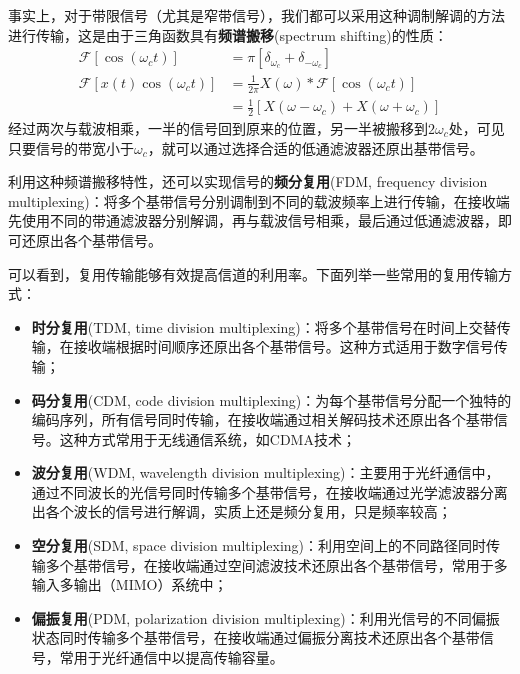 事实上，对于带限信号（尤其是窄带信号），我们都可以采用这种调制解调的方法进行传输，这是由于三角函数具有\textbf{频谱搬移}(spectrum shifting)的性质：\begin{align*}
    \mathcal{F} \left[\cos(\omega_c t)\right]&=\pi\left[\delta_{\omega_c}+\delta_{-\omega_c}\right]\\
    \mathcal{F}\left[x(t)\cos(\omega_c t)\right]&=\frac{1}{2\pi}X(\omega)*\mathcal{F}\left[\cos(\omega_c t)\right]\\
    &=\frac{1}{2}\left[X(\omega-\omega_c)+X(\omega+\omega_c)\right]
\end{align*}
经过两次与载波相乘，一半的信号回到原来的位置，另一半被搬移到$2\omega_c$处，可见只要信号的带宽小于$\omega_c$，就可以通过选择合适的低通滤波器还原出基带信号。

利用这种频谱搬移特性，还可以实现信号的\textbf{频分复用}(FDM, frequency division multiplexing)：将多个基带信号分别调制到不同的载波频率上进行传输，在接收端先使用不同的带通滤波器分别解调，再与载波信号相乘，最后通过低通滤波器，即可还原出各个基带信号。

可以看到，复用传输能够有效提高信道的利用率。下面列举一些常用的复用传输方式：\begin{itemize}
    \item \textbf{时分复用}(TDM, time division multiplexing)：将多个基带信号在时间上交替传输，在接收端根据时间顺序还原出各个基带信号。这种方式适用于数字信号传输；
    \item \textbf{码分复用}(CDM, code division multiplexing)：为每个基带信号分配一个独特的编码序列，所有信号同时传输，在接收端通过相关解码技术还原出各个基带信号。这种方式常用于无线通信系统，如CDMA技术；
    \item \textbf{波分复用}(WDM, wavelength division multiplexing)：主要用于光纤通信中，通过不同波长的光信号同时传输多个基带信号，在接收端通过光学滤波器分离出各个波长的信号进行解调，实质上还是频分复用，只是频率较高；
    \item \textbf{空分复用}(SDM, space division multiplexing)：利用空间上的不同路径同时传输多个基带信号，在接收端通过空间滤波技术还原出各个基带信号，常用于多输入多输出（MIMO）系统中；
    \item \textbf{偏振复用}(PDM, polarization division multiplexing)：利用光信号的不同偏振状态同时传输多个基带信号，在接收端通过偏振分离技术还原出各个基带信号，常用于光纤通信中以提高传输容量。
\end{itemize}
